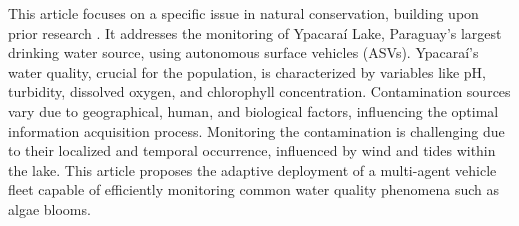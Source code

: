 \documentclass[journal]{IEEEtran}
\newcommand\changes[1]{\textcolor{black}{#1}}
\begin{document}

This article focuses on a specific issue in natural conservation, building upon prior research \cite{kathen2022aquafelpso, peralta_MULTIOBJECTIVE}. It addresses the monitoring of Ypacaraí Lake, Paraguay's largest drinking water source, using autonomous surface vehicles (ASVs). Ypacaraí's water quality, crucial for the population, is characterized by variables like pH, turbidity, dissolved oxygen, and chlorophyll concentration. Contamination sources vary due to geographical, human, and biological factors, influencing the optimal information acquisition process. Monitoring the contamination is challenging due to their localized and temporal occurrence, influenced by wind and tides within the lake. This article proposes the adaptive deployment of a multi-agent vehicle fleet capable of efficiently monitoring common water quality phenomena such as algae blooms.
\end{document}
